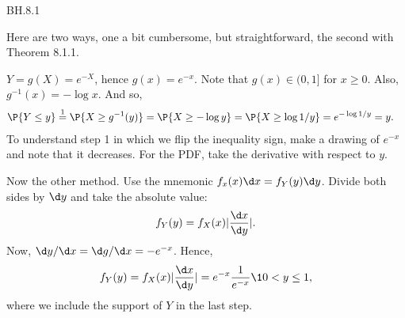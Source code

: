 
\setcounter{theorem}{0}
\begin{exercise} BH.8.1
\begin{solution}
Here are two ways, one a bit cumbersome, but straightforward, the second with Theorem 8.1.1.

$Y=g(X) = e^{-X}$, hence $g(x) = e^{-x}$. Note that $g(x) \in (0, 1]$ for $x\geq 0$. Also, $g^{-1}(x) = -\log x$. And so,
\begin{align*}
  \P{Y\leq y} &\stackrel1= \P{X \geq g^{-1}(y)} = \P{X \geq -\log y} = \P{X\geq \log 1/y} = e^{-\log 1/y} =  y.
\end{align*}
To understand step 1 in which we flip the inequality sign, make a drawing of $e^{-x}$ and note that it decreases.
For the PDF, take the derivative with respect to $y$.

Now the other method. Use the mnemonic $f_{x}(x) \d x = f_{Y}(y) \d y$. Divide both sides by $\d y$ and take the absolute value:
\begin{align*}
  f_{Y}(y) = f_{X}(x) |\frac{\d x}{\d y}|.
\end{align*}
Now, $\d y/\d x = \d g/\d x = -e^{-x}$. Hence,
\begin{align*}
  f_{Y}(y) = f_{X}(x) |\frac{\d x}{\d y}| = e^{-x} \frac{1}{e^{-x}} \1 {0< y \leq 1},
\end{align*}
where we include the support of $Y$ in the last step.

\end{solution}
\end{exercise}

